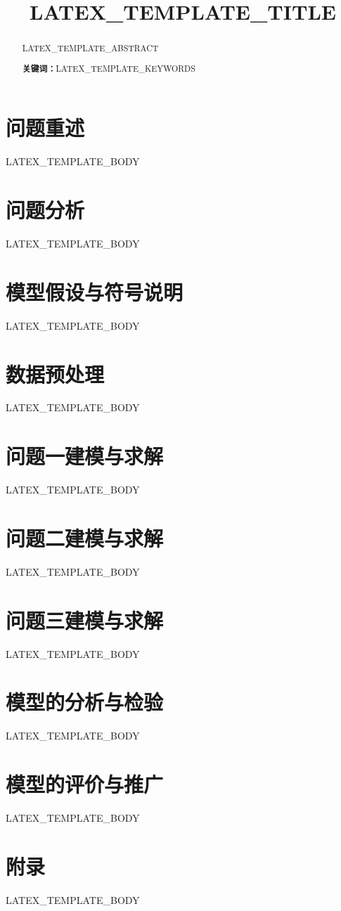 \documentclass[UTF8,12pt,a4paper]{ctexart}
\title{LATEX_TEMPLATE_TITLE}
\author{}
\date{}
\newcommand{\keywords}[1]{\par\noindent\textbf{关键词：}#1}
\begin{document}
\begin{abstract}
LATEX_TEMPLATE_ABSTRACT
\keywords{LATEX_TEMPLATE_KEYWORDS}
\end{abstract}

\section{问题重述}
LATEX_TEMPLATE_BODY

\section{问题分析}
LATEX_TEMPLATE_BODY

\section{模型假设与符号说明}
LATEX_TEMPLATE_BODY

\section{数据预处理}
LATEX_TEMPLATE_BODY

\section{问题一建模与求解}
LATEX_TEMPLATE_BODY

\section{问题二建模与求解}
LATEX_TEMPLATE_BODY

\section{问题三建模与求解}
LATEX_TEMPLATE_BODY

\section{模型的分析与检验}
LATEX_TEMPLATE_BODY

\section{模型的评价与推广}
LATEX_TEMPLATE_BODY




\appendix
\section{附录}
LATEX_TEMPLATE_BODY
\end{document}
